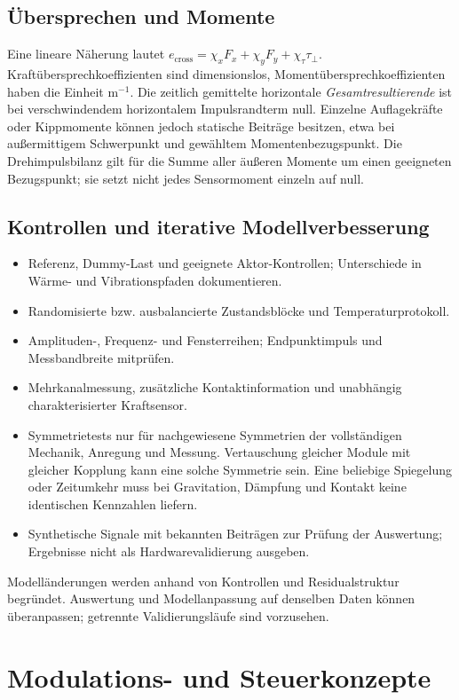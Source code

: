 \documentclass[11pt,a4paper]{article}
\begin{document}
\subsection{Übersprechen und Momente}
Eine lineare Näherung lautet $e_{\mathrm{cross}}=\chi_xF_x+\chi_yF_y+\chi_{\tau}\tau_{\perp}$. Kraftübersprechkoeffizienten sind dimensionslos, Momentübersprechkoeffizienten haben die Einheit m$^{-1}$.
Die zeitlich gemittelte horizontale \emph{Gesamtresultierende} ist bei verschwindendem horizontalem Impulsrandterm null. Einzelne Auflagekräfte oder Kippmomente können jedoch statische Beiträge besitzen, etwa bei außermittigem Schwerpunkt und gewähltem Momentenbezugspunkt. Die Drehimpulsbilanz gilt für die Summe aller äußeren Momente um einen geeigneten Bezugspunkt; sie setzt nicht jedes Sensormoment einzeln auf null.

\subsection{Kontrollen und iterative Modellverbesserung}
\begin{itemize}
\item Referenz, Dummy-Last und geeignete Aktor-Kontrollen; Unterschiede in Wärme- und Vibrationspfaden dokumentieren.
\item Randomisierte bzw. ausbalancierte Zustandsblöcke und Temperaturprotokoll.
\item Amplituden-, Frequenz- und Fensterreihen; Endpunktimpuls und Messbandbreite mitprüfen.
\item Mehrkanalmessung, zusätzliche Kontaktinformation und unabhängig charakterisierter Kraftsensor.
\item Symmetrietests nur für nachgewiesene Symmetrien der vollständigen Mechanik, Anregung und Messung. Vertauschung gleicher Module mit gleicher Kopplung kann eine solche Symmetrie sein. Eine beliebige Spiegelung oder Zeitumkehr muss bei Gravitation, Dämpfung und Kontakt keine identischen Kennzahlen liefern.
\item Synthetische Signale mit bekannten Beiträgen zur Prüfung der Auswertung; Ergebnisse nicht als Hardwarevalidierung ausgeben.
\end{itemize}
Modelländerungen werden anhand von Kontrollen und Residualstruktur begründet. Auswertung und Modellanpassung auf denselben Daten können überanpassen; getrennte Validierungsläufe sind vorzusehen.

\section{Modulations- und Steuerkonzepte}\label{sec:modulation}
\end{document}
